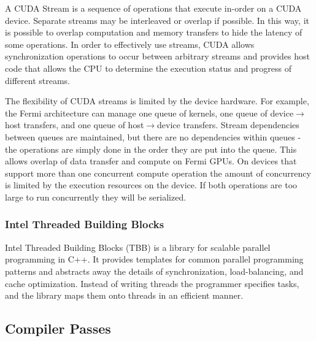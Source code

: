 A CUDA Stream is a sequence of operations that
execute in-order on a CUDA device. Separate streams may be interleaved or
overlap if possible. In this way, it is possible to overlap computation and
memory transfers to hide the latency of some operations.
In order to effectively use streams, CUDA allows synchronization operations
to occur between arbitrary streams and provides host code that allows the
CPU to determine the execution status and progress of different streams.

The flexibility of CUDA streams is limited by the device hardware.
For example, the Fermi architecture can manage one queue of kernels, one queue
of device$\rightarrow$host transfers, and one queue of host$\rightarrow$device
transfers. Stream
dependencies between queues are maintained, but there are no dependencies
within queues - the operations are simply done in the order they are put into
the queue. This allows overlap of data transfer and compute on Fermi GPUs.
On devices that support more than one concurrent compute operation the amount
of concurrency is limited by the execution resources on the device. If both
operations are too large to run concurrently they will be serialized.

\subsubsection*{Intel Threaded Building Blocks}
Intel Threaded Building Blocks \cite{reinders2007intel} (TBB) is a library for
scalable parallel
programming in C++. It provides templates for common parallel programming
patterns and abstracts away the details of synchronization, load-balancing,
and cache optimization. Instead of writing threads the programmer specifies
tasks, and the library maps them onto threads in an efficient manner.


\subsection*{Compiler Passes}

\subsubsection*{}

\subsubsection*{}

\subsubsection*{}


